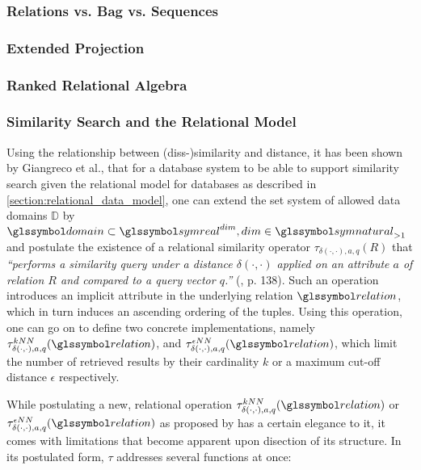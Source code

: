 \subsubsection{Relations vs. Bag vs. Sequences}

\subsubsection{Extended Projection}

\subsubsection{Ranked Relational Algebra}

\subsubsection{Similarity Search and the Relational Model}

Using the relationship between (diss-)similarity and distance, it has been shown by Giangreco et al., that for a database system to be able to support similarity search given the relational model for databases as described in \cref{section:relational_data_model}, one can extend the set system of allowed data domains $\mathbb{D}$ by $\domain \subset \symreal^{dim}, dim \in \symnatural_{>1}$ and postulate the existence of a relational similarity operator $\tau_{\delta(\cdot,\cdot),a,q}(R)$ that \emph{``performs a similarity query under a distance $\delta(\cdot,\cdot)$ applied on an attribute $a$ of relation $R$ and compared to a query vector $q$.''} (\cite{Giangreco:2018thesis}, p. 138). Such an operation introduces an implicit attribute in the underlying relation $\relation$, which in turn induces an ascending ordering of the tuples. Using this operation, one can go on to define two concrete implementations, namely $\tau^{kNN}_{\delta(\cdot,\cdot),a,q}(\relation)$, and $\tau^{\epsilon NN}_{\delta(\cdot,\cdot),a,q}(\relation)$, which limit the number of retrieved results by their cardinality $k$ or a maximum cut-off distance $\epsilon$ respectively.

While postulating a new, relational operation $\tau^{kNN}_{\delta(\cdot,\cdot),a,q}(\relation)$ or $\tau^{\epsilon NN}_{\delta(\cdot,\cdot),a,q}(\relation)$ as proposed by \cite{Giangreco:2018thesis} has a certain elegance to it, it comes with limitations that become apparent upon disection of its structure. In its postulated form, $\tau$ addresses several functions at once:

